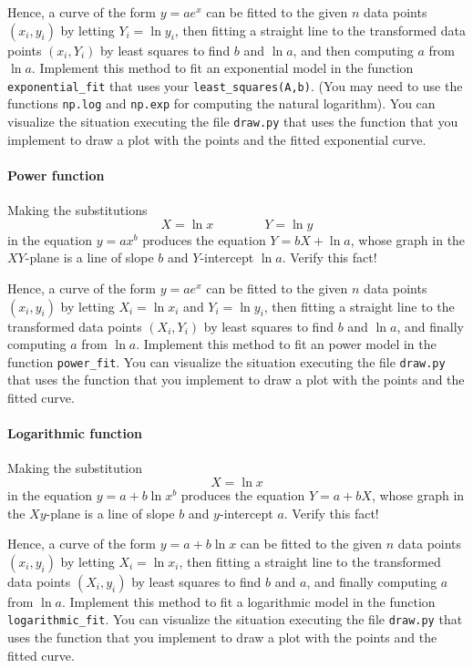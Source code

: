 \documentclass[a4paper,10pt]{article}
\begin{document}
Hence, a curve of the form $y=ae^x$ can be fitted to the given $n$ data
points $(x_i,y_i)$ by letting $Y_i=\ln y_i$, then fitting a straight
line to the transformed data points $(x_i,Y_i)$ by least squares to find
$b$ and $\ln a$, and then computing $a$ from $\ln a$.  Implement this
method to fit an exponential model in the function
\lstinline{exponential_fit} that uses your
\lstinline{least_squares(A,b)}. (You may need to use the functions
\lstinline{np.log} and \lstinline{np.exp} for computing the natural
logarithm). You can visualize the situation executing the file
\lstinline{draw.py} that uses the function that you implement to draw a
plot with the points and the fitted exponential curve.

\paragraph{Power function}
Making the substitutions \[X=\ln x\qquad \qquad Y=\ln y\] in the
equation $y=ax^b$ produces the equation $Y=bX+\ln a$, whose graph in the
$XY$-plane is a line of slope $b$ and $Y$-intercept $\ln a$.  Verify
this fact!

Hence, a curve of the form $y=ae^x$ can be fitted to the given $n$ data
points $(x_i,y_i)$ by letting $X_i=\ln x_i$ and $Y_i=\ln y_i$, then
fitting a straight line to the transformed data points $(X_i,Y_i)$ by
least squares to find $b$ and $\ln a$, and finally computing $a$ from $\ln
a$.  Implement this method to fit an power model in the function
\lstinline{power_fit}. You can visualize the situation executing the
file \lstinline{draw.py} that uses the function that you implement to
draw a plot with the points and the fitted curve.


\paragraph{Logarithmic function} Making the substitution \[X=\ln x\]
in the equation $y=a+b\ln x^b$ produces the equation $Y=a+bX$, whose
graph in the $Xy$-plane is a line of slope $b$ and $y$-intercept
$a$. Verify this fact!

Hence, a curve of the form $y=a+b\ln x$ can be fitted to the given $n$ data
points $(x_i,y_i)$ by letting $X_i=\ln x_i$, then fitting a straight
line to the transformed data points $(X_i,y_i)$ by least squares to find
$b$ and $a$, and finally computing $a$ from $\ln a$.  Implement this
method to fit a logarithmic model in the function
\lstinline{logarithmic_fit}. You can visualize the situation executing
the file \lstinline{draw.py} that uses the function that you implement
to draw a plot with the points and the fitted curve.
\end{document}
